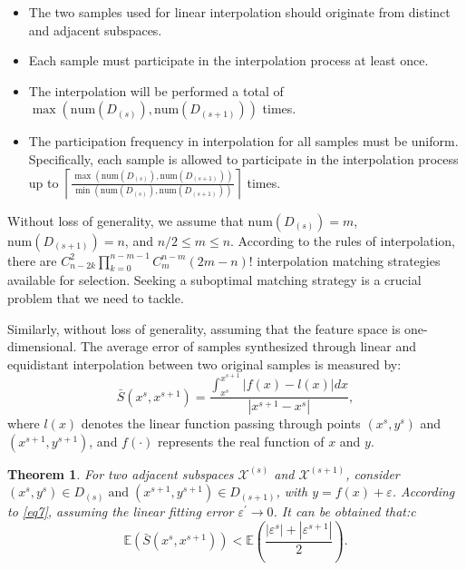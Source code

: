 \documentclass[final,3p,times]{elsarticle}
\newtheorem{theorem}{Theorem}
\begin{document}
\begin{itemize}
  \item The two samples used for linear interpolation should 
  originate from distinct and adjacent subspaces.
  \item Each sample must participate in the interpolation 
  process at least once.
  \item The interpolation will be performed a total of 
  $\max(\text{num}{(D_{(s)}),\text{num}(D_{(s+1)})})$ times.
  \item The participation frequency in interpolation for all 
  samples must be uniform. Specifically, each sample is allowed 
  to participate in the interpolation process up to 
  $\left\lceil \frac{\max(\text{num}{(D_{(s)}),
  \text{num}(D_{(s+1)})})}{\min(\text{num}{(D_{(s)}),
  \text{num}(D_{(s+1)})})}\right\rceil$ times.
\end{itemize}

Without loss of generality, we 
assume that $\text{num}(D_{(s)})=m$, $\text{num}(D_{(s+1)})=n$, 
and $n/2\le m \le n$. According to the rules of interpolation, 
there are $C_{n-2k}^{2}\prod_{k=0}^{n-m-1} C_{m}^{n-m}(2m-n)!$ 
interpolation matching strategies available for selection. 
Seeking a suboptimal matching strategy is a crucial problem 
that we need to tackle.

Similarly, without loss of generality, assuming that the feature 
space is one-dimensional. The average error of samples synthesized 
through linear and equidistant interpolation between two original 
samples is measured by:
\begin{equation} 
\label{eq12}
\bar{S}(x^s,x^{s+1})=\frac{\int_{x^s}^{x^{s+1}}|f(x)-l(x)|  dx}
{|x^{s+1}-x^s|}, 
\end{equation}
where $l(x)$ denotes the linear function passing through points 
$(x^s,y^s)$ and $(x^{s+1},y^{s+1})$, and $f(\cdot)$ represents
 the real function of $x$ and $y$. 

\begin{theorem}
\label{the2}
For two adjacent subspaces $\mathcal{X}^{(s)}$ and $\mathcal{X}^{(s+1)}$, 
consider $(x^s,y^s)\in D_{(s)}\;\text{and}\; (x^{s+1},y^{s+1})
\in D_{(s+1)}$, with $y=f(x)+\varepsilon$. According to \eqref{eq7}, 
assuming the linear fitting error $\varepsilon^\prime\rightarrow0$. 
It can be obtained that:c
\begin{equation}
\label{eq13}
\mathbb{E} (\bar{S}(x^s,x^{s+1}))< \mathbb{E}(\frac{|\varepsilon^s|
+|\varepsilon^{s+1}|}{2}).
\end{equation}
\end{theorem}
\end{document}
